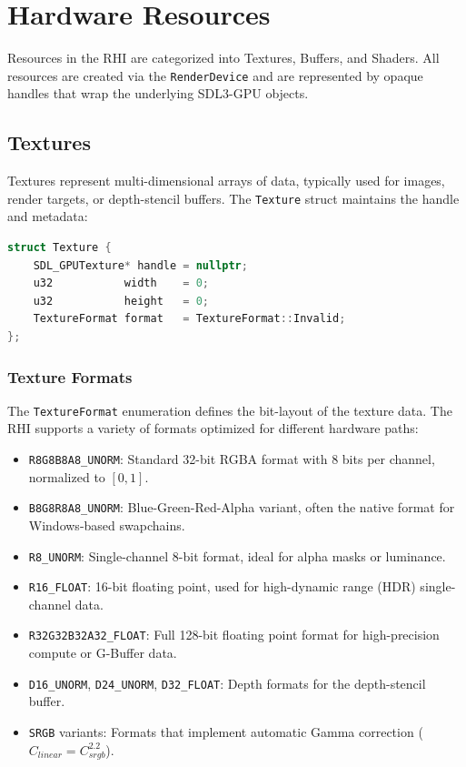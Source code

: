 \section{Hardware Resources}

Resources in the RHI are categorized into Textures, Buffers, and Shaders. All resources are created via the \texttt{RenderDevice} and are represented by opaque handles that wrap the underlying SDL3-GPU objects.

\subsection{Textures}

Textures represent multi-dimensional arrays of data, typically used for images, render targets, or depth-stencil buffers. The \texttt{Texture} struct maintains the handle and metadata:

\begin{lstlisting}[language=C++]
struct Texture {
    SDL_GPUTexture* handle = nullptr;
    u32           width    = 0;
    u32           height   = 0;
    TextureFormat format   = TextureFormat::Invalid;
};
\end{lstlisting}

\subsubsection{Texture Formats}

The \texttt{TextureFormat} enumeration defines the bit-layout of the texture data. The RHI supports a variety of formats optimized for different hardware paths:

\begin{itemize}
    \item \texttt{R8G8B8A8\_UNORM}: Standard 32-bit RGBA format with 8 bits per channel, normalized to $[0, 1]$.
    \item \texttt{B8G8R8A8\_UNORM}: Blue-Green-Red-Alpha variant, often the native format for Windows-based swapchains.
    \item \texttt{R8\_UNORM}: Single-channel 8-bit format, ideal for alpha masks or luminance.
    \item \texttt{R16\_FLOAT}: 16-bit floating point, used for high-dynamic range (HDR) single-channel data.
    \item \texttt{R32G32B32A32\_FLOAT}: Full 128-bit floating point format for high-precision compute or G-Buffer data.
    \item \texttt{D16\_UNORM}, \texttt{D24\_UNORM}, \texttt{D32\_FLOAT}: Depth formats for the depth-stencil buffer.
    \item \texttt{SRGB} variants: Formats that implement automatic Gamma correction ($C_{linear} = C_{srgb}^{2.2}$).
\end{itemize}

